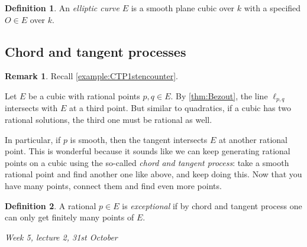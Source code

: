 \documentclass{article}
\theoremstyle{definition}
\newtheorem{defn}{Definition}[subsection]
\newtheorem*{remark}{Remark}
\begin{document}
\begin{defn}
An \textit{elliptic curve} $E$ is a smooth plane cubic over $k$ with a specified $O\in E$ over $k$.
\end{defn}

\subsection{Chord and tangent processes}
\begin{remark}
Recall \ref{example:CTP1stencounter}.

Let $E$ be a cubic with rational points $p,q\in E$. By \ref{thm:Bezout}, the line $\ell_{p,q}$ intersects with $E$ at a third point. But similar to quadratics, if a cubic has two rational solutions, the third one must be rational as well.

In particular, if $p$ is smooth, then the tangent intersects $E$ at another rational point. This is wonderful because it sounds like we can keep generating rational points on a cubic using the so-called \textit{chord and tangent process}: take a smooth rational point and find another one like above, and keep doing this. Now that you have many points, connect them and find even more points.
\end{remark}

\begin{defn}
A rational $p\in E$ is \textit{exceptional} if by chord and tangent process one can only get finitely many points of $E$.
\end{defn}

\begin{flushright}
\textit{Week 5, lecture 2, 31st October}
\end{flushright}
\end{document}
